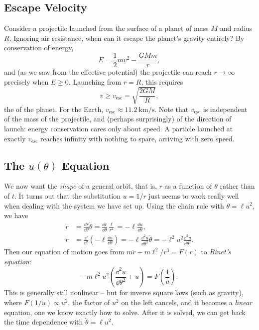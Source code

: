 \documentclass[a4paper]{scrartcl}
\begin{document}
\subsection{Escape Velocity}

Consider a projectile launched from the surface of a planet of mass $M$ and radius $R$. Ignoring air resistance, when can it escape the planet's gravity entirely? By conservation of energy,
$$
E = \frac{1}{2}mv^2 - \frac{GMm}{r},
$$
and (as we saw from the effective potential) the projectile can reach $r \to \infty$ precisely when $E \geq 0$. Launching from $r = R$, this requires
$$
v \geq v_{\text{esc}} = \sqrt{\frac{2GM}{R}},
$$
the  of the planet. For the Earth, $v_{\text{esc}} \approx \SI{11.2}{\kilo\meter\per\second}$. Note that $v_{\text{esc}}$ is independent of the mass of the projectile, and (perhaps surprisingly) of the direction of launch: energy conservation cares only about speed. A particle launched at exactly $v_{\text{esc}}$ reaches infinity with nothing to spare, arriving with zero speed.

\subsection{The $u(\theta)$ Equation}

We now want the \emph{shape} of a general orbit, that is, $r$ as a function of $\theta$ rather than of $t$. It turns out that the substitution $u = 1/r$ just seems to work really well when dealing with the system we have set up. Using the chain rule with $\dot\theta = \ell u^2$, we have
\begin{align*}
	\dot{r} &= \frac{\dd r}{\dd \theta} \dot{\theta} = \frac{\dd r}{\dd\theta} \frac{\ell}{r^2} = -\ell \frac{\dd u}{\dd \theta}, \\
	\ddot{r} &= \frac{\dd}{\dd t}\left(- \ell \frac{\dd u}{\dd\theta}\right) = -\ell \frac{\dd^2 u}{\dd\theta^2}\dot{\theta} = -\ell^2 u^2 \frac{\dd^2 u}{\dd \theta^2}.
\end{align*}
Then our equation of motion goes from $m \ddot{r} - m\ell^2/r^3 = F(r)$ to \emph{Binet's equation}:
$$
-m\ell^2 u^2 \left(\frac{\dd^2 u }{\dd \theta^2} + u\right) = F\left(\frac{1}{u}\right).
$$
This is generally still nonlinear -- but for inverse square laws (such as gravity), where $F(1/u) \propto u^2$, the factor of $u^2$ on the left cancels, and it becomes a \emph{linear} equation, one we know exactly how to solve. After it is solved, we can get back the time dependence with $\dot{\theta} = \ell u^2$.
\end{document}
